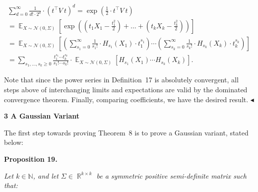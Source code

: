 \documentclass[10pt,a4paper]{article}
\begin{document}
\[\begin{gathered}
\displaystyle\sum_{d=0}^{\infty}\frac{1}{d!\cdot 2^{d}}\cdot\left(t^{\top}V\ t\right)^{d} \displaystyle=\exp\left(\frac{1}{2}\cdot t^{\top}V\ t\right) \\
\displaystyle=\mathop{\mathbb{E}}_{X\sim\mathcal{N}(0,\Sigma)}\left[\exp\left(\left(t_{1}X_{1}-\frac{t_{1}^{2}}{2}\right)+\dots+\left(t_{k}X_{k}-\frac{t_{k}^{2}}{2}\right)\right)\right] \\
\displaystyle=\mathop{\mathbb{E}}_{X\sim\mathcal{N}(0,\Sigma)}\left[\left(\sum_{s_{1}=0}^{\infty}\frac{1}{s_{1}!}\cdot H_{s_{1}}(X_{1})\cdot t_{1}^{s_{1}}\right)\cdots\left(\sum_{s_{k}=0}^{\infty}\frac{1}{s_{k}!}\cdot H_{s_{k}}(X_{k})\cdot t_{k}^{s_{k}}\right)\right] \\
\displaystyle=\sum_{s_{1},\dots,s_{k}\geqslant 0}\frac{t_{1}^{s_{1}}\cdots t_{k}^{s_{k}}}{s_{1}!\cdots s_{k}!}\cdot\mathop{\mathbb{E}}_{X\sim\mathcal{N}(0,\Sigma)}\left[H_{s_{1}}(X_{1})\cdots H_{s_{k}}(X_{k})\right].
\end{gathered}\]


Note that since the power series in Definition 17 is absolutely convergent, all steps above of interchanging limits and expectations are valid by the dominated convergence theorem.
Finally, comparing coefficients, we have the desired result.
$\blacktriangleleft$\par






\par\medskip\noindent\textbf{
3 A Gaussian Variant}\par




The first step towards proving Theorem 8 is to prove a Gaussian variant, stated below:\par





\par\medskip\noindent\textbf{
\textbf{Proposition 19}\textbf{.}
}\par



\emph{Let $k\in\mathbb{N}$, and let $\Sigma\in\mathop{\mathbb{R}}^{k\times k}$ be a symmetric positive semi-definite matrix such that:}\par
\end{document}
